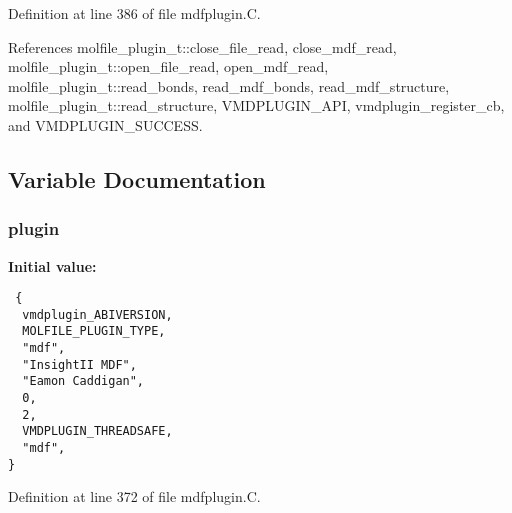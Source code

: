 Definition at line 386 of file mdfplugin.C.

References molfile\_\-plugin\_\-t::close\_\-file\_\-read, close\_\-mdf\_\-read, molfile\_\-plugin\_\-t::open\_\-file\_\-read, open\_\-mdf\_\-read, molfile\_\-plugin\_\-t::read\_\-bonds, read\_\-mdf\_\-bonds, read\_\-mdf\_\-structure, molfile\_\-plugin\_\-t::read\_\-structure, VMDPLUGIN\_\-API, vmdplugin\_\-register\_\-cb, and VMDPLUGIN\_\-SUCCESS.

\subsection{Variable Documentation}
\subsubsection{ plugin\hspace{0.3cm}{\tt  [static]}}\label{mdfplugin_8C_a3}


{\bf Initial value:}

\footnotesize\begin{verbatim} {
  vmdplugin_ABIVERSION,   
  MOLFILE_PLUGIN_TYPE,    
  "mdf",                  
  "InsightII MDF",        
  "Eamon Caddigan",       
  0,                      
  2,                      
  VMDPLUGIN_THREADSAFE,   
  "mdf",                  
}\end{verbatim}\normalsize 


Definition at line 372 of file mdfplugin.C.